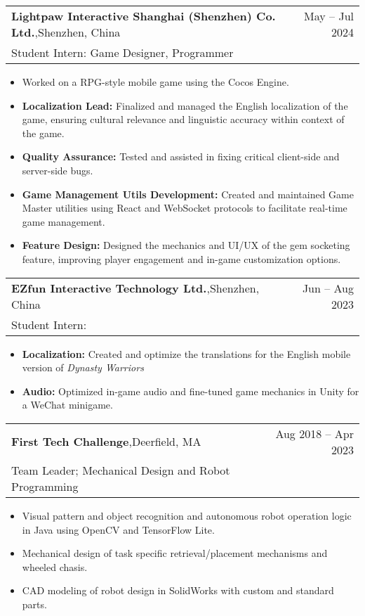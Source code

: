 \documentclass[oneside, 11pt]{article}
\newcommand*{\experienceEntry}[4]{
	\noindent
	\begin{tabularx}{\textwidth}{Xr}
	\textbf{#1},\quad #2 & #3\\
	#4
	\end{tabularx}
	\vspace{-0.75\baselineskip}
}
\newenvironment{expD}
	{\begin{itemize}[noitemsep,topsep=0pt]}
	{\end{itemize}}
\begin{document}
\experienceEntry{Lightpaw Interactive Shanghai (Shenzhen) Co. Ltd.}
	{Shenzhen, China}
	{May -- Jul 2024}
	{Student Intern: Game Designer, Programmer}

\begin{expD}
	\item Worked on a RPG-style mobile game using the Cocos Engine.
	\item \textbf{Localization Lead:} Finalized and managed the English localization of the game, ensuring cultural relevance and linguistic accuracy within context of the game.
	\item \textbf{Quality Assurance:} Tested and assisted in fixing critical client-side and server-side bugs.
	\item \textbf{Game Management Utils Development:} Created and maintained Game Master utilities using React and WebSocket protocols to facilitate real-time game management.
	\item \textbf{Feature Design:} Designed the mechanics and UI/UX of the gem socketing feature, improving player engagement and in-game customization options.
\end{expD}

\experienceEntry{EZfun Interactive Technology Ltd.}
	{Shenzhen, China}
	{Jun -- Aug 2023}
	{Student Intern: }

\begin{expD}
	\item \textbf{Localization:} Created and optimize the translations for the English mobile version of \textit{Dynasty Warriors}
	\item \textbf{Audio:} Optimized in-game audio and fine-tuned game mechanics in Unity for a WeChat minigame.
\end{expD}



\experienceEntry{First Tech Challenge}
	{Deerfield, MA}
	{Aug 2018 -- Apr 2023}
	{Team Leader; Mechanical Design and Robot Programming}

\begin{expD}
	\item Visual pattern and object recognition and autonomous robot operation logic in Java using OpenCV and TensorFlow Lite.
	\item Mechanical design of task specific retrieval/placement mechanisms and wheeled chasis.
	\item CAD modeling of robot design in SolidWorks with custom and standard parts.
\end{expD}
\end{document}
